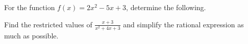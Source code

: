 \documentclass[11pt]{exam}
\begin{document}
\begin{questions}
\question[15] For the function $f(x)=2x^2-5x+3$, determine the following.
\noaddpoints
\vspace{2pt}
\addpoints

\question[5] Find the restricted values of $\displaystyle \frac{x+3}{x^2+4x+3}$ and simplify the rational expression as much as possible.
\addpoints
\end{questions}
\end{document}
